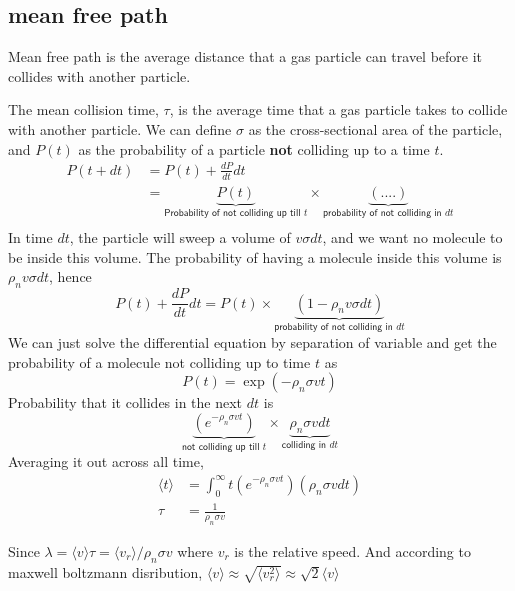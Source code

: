 \subsection{mean free path}
Mean free path is the average distance that a gas particle can travel before it collides with another particle. 

The mean collision time, $\tau$, is the average time that a gas particle takes to collide with another particle. We can define $\sigma$ as the cross-sectional area of the particle, and $P(t)$ as the probability of a particle \textbf{not} colliding up to a time $t$. 
\begin{align}
    P(t+dt)&=P(t)+\frac{dP}{dt}dt\\
    &= \underbrace{P(t)}_{\textsf{Probability of not colliding up till $t$}} \times \underbrace{(....)}_{\textsf{probability of not colliding in $dt$}}\\
\end{align} 
In time $dt$, the particle will sweep a volume of $v\sigma dt$, and we want no molecule to be inside this volume. The probability of having a molecule inside this volume is $\rho_n v \sigma dt$, hence
\begin{equation}
    P(t)+\frac{dP}{dt}dt=P(t)\times\underbrace{(1-\rho_n v\sigma dt)}_{\textsf{probability of not colliding in $dt$}}
\end{equation}
We can just solve the differential equation by separation of variable and get the probability of a molecule not colliding up to time $t$ as
\begin{equation}
    P(t)=\exp(-\rho_n \sigma v t)
\end{equation}
Probability that it collides in the next $dt$ is 
\begin{equation}
    \underbrace{(e^{-\rho_n \sigma v t})}_{\textsf{not colliding up till $t$}} \times \underbrace{\rho_n \sigma v dt}_{\textsf{colliding in $dt$}} 
\end{equation}
Averaging it out across all time,
\begin{align}
    \langle t \rangle &= \int_0^{\infty}t(e^{-\rho_n \sigma v t})(\rho_n \sigma v dt)\\
    \tau &= \frac{1}{\rho_n \sigma v}
\end{align}

Since $\lambda=\langle v\rangle \tau = \langle v_r \rangle/\rho_n \sigma v$ where $v_r$ is the relative speed. And according to maxwell boltzmann disribution, $\langle v \rangle \approx \sqrt {\langle v_r ^2 \rangle} \approx \sqrt{2} \langle v \rangle$

